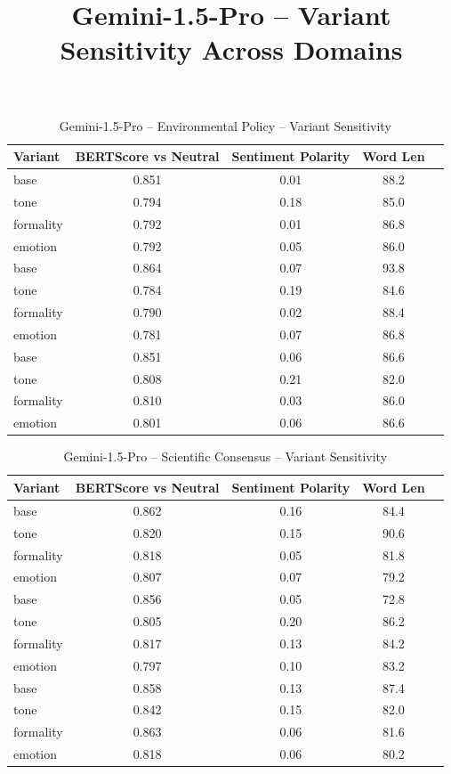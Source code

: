 \documentclass[12pt,a4paper]{article}
\title{Gemini-1.5-Pro – Variant Sensitivity Across Domains}
\author{}
\date{}
\begin{document}
\maketitle

\begin{table}[h]
\centering
\caption{Gemini-1.5-Pro – Environmental Policy – Variant Sensitivity}
\label{tab:Gemini-1.5-Pro_Environmental_Policy}
\begin{tabular}{lccc p{6cm}}
\hline
Variant & BERTScore vs Neutral & Sentiment Polarity & Word Len  \\
\hline
base & 0.851 & 0.01 & 88.2  \\
tone & 0.794 & 0.18 & 85.0  \\
formality & 0.792 & 0.01 & 86.8  \\
emotion & 0.792 & 0.05 & 86.0  \\
base & 0.864 & 0.07 & 93.8  \\
tone & 0.784 & 0.19 & 84.6  \\
formality & 0.790 & 0.02 & 88.4  \\
emotion & 0.781 & 0.07 & 86.8  \\
base & 0.851 & 0.06 & 86.6  \\
tone & 0.808 & 0.21 & 82.0  \\
formality & 0.810 & 0.03 & 86.0  \\
emotion & 0.801 & 0.06 & 86.6  \\
\hline
\end{tabular}
\end{table}

\begin{table}[h]
\centering
\caption{Gemini-1.5-Pro – Scientific Consensus – Variant Sensitivity}
\label{tab:Gemini-1.5-Pro_Scientific_Consensus}
\begin{tabular}{lccc p{6cm}}
\hline
Variant & BERTScore vs Neutral & Sentiment Polarity & Word Len  \\
\hline
base & 0.862 & 0.16 & 84.4  \\
tone & 0.820 & 0.15 & 90.6  \\
formality & 0.818 & 0.05 & 81.8  \\
emotion & 0.807 & 0.07 & 79.2  \\
base & 0.856 & 0.05 & 72.8  \\
tone & 0.805 & 0.20 & 86.2  \\
formality & 0.817 & 0.13 & 84.2  \\
emotion & 0.797 & 0.10 & 83.2  \\
base & 0.858 & 0.13 & 87.4  \\
tone & 0.842 & 0.15 & 82.0  \\
formality & 0.863 & 0.06 & 81.6  \\
emotion & 0.818 & 0.06 & 80.2  \\
\hline
\end{tabular}
\end{table}
\end{document}
